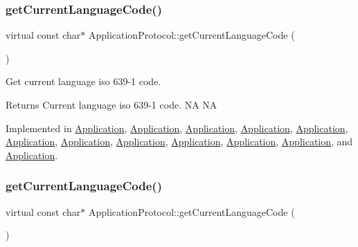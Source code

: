 \subsubsection{\texorpdfstring{get\+Current\+Language\+Code()}{getCurrentLanguageCode()}\hspace{0.1cm}{\footnotesize\ttfamily [1/2]}}
{\footnotesize\ttfamily virtual const char$\ast$ Application\+Protocol\+::get\+Current\+Language\+Code (\begin{DoxyParamCaption}{ }\end{DoxyParamCaption})\hspace{0.3cm}{\ttfamily [pure virtual]}}



Get current language iso 639-\/1 code. 

\begin{DoxyReturn}{Returns}
Current language iso 639-\/1 code.  NA  NA 
\end{DoxyReturn}


Implemented in \hyperlink{classApplication_a47bfc4cd5a784ce46bd05e727b2e8781}{Application}, \hyperlink{classApplication_a47bfc4cd5a784ce46bd05e727b2e8781}{Application}, \hyperlink{classApplication_a47bfc4cd5a784ce46bd05e727b2e8781}{Application}, \hyperlink{classApplication_a47bfc4cd5a784ce46bd05e727b2e8781}{Application}, \hyperlink{classApplication_a47bfc4cd5a784ce46bd05e727b2e8781}{Application}, \hyperlink{classApplication_a47bfc4cd5a784ce46bd05e727b2e8781}{Application}, \hyperlink{classApplication_a8b381edef7fa6ce48092073c6d843c4b}{Application}, \hyperlink{classApplication_a47bfc4cd5a784ce46bd05e727b2e8781}{Application}, \hyperlink{classApplication_aed89715279c32959c41ec88fa65018a7}{Application}, \hyperlink{classApplication_aa110b9387e32148fec4bf913250bbac2}{Application}, \hyperlink{classApplication_aed89715279c32959c41ec88fa65018a7}{Application}, and \hyperlink{classApplication_aed89715279c32959c41ec88fa65018a7}{Application}.

\mbox{\label{classApplicationProtocol_a4cb7a696dd51fee3ebb3075f0cca1455}} 
\subsubsection{\texorpdfstring{get\+Current\+Language\+Code()}{getCurrentLanguageCode()}\hspace{0.1cm}{\footnotesize\ttfamily [2/2]}}
{\footnotesize\ttfamily virtual const char$\ast$ Application\+Protocol\+::get\+Current\+Language\+Code (\begin{DoxyParamCaption}{ }\end{DoxyParamCaption})\hspace{0.3cm}{\ttfamily [pure virtual]}}



